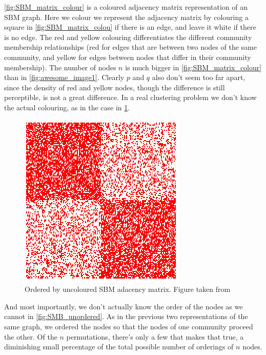 \ref{fig:SBM_matrix_colour} is a coloured adjacency matrix representation of an SBM graph. Here we colour we represent the adjacency matrix by colouring a square in \ref{fig:SBM_matrix_colou} if there is an edge, and leave it white if there is no edge.  The red and yellow colouring differentiates the different community membership relationships (red for edges that are between two nodes of the same community, and yellow for edges between nodes that differ in their community membership). The number of nodes $n$ is much bigger in \ref{fig:SBM_matrix_colour} than in \ref{fig:awesome_image1}. Clearly $p$ and $q$ also don't seem too far apart, since the density of red and yellow nodes, though the difference is still perceptible, is not a great difference.  In a real clustering problem we don't know the actual colouring, as in the case in \ref{fig:SMB_uncolored}.

\begin{figure}[h]
\begin{center}
  \includegraphics[scale=0.5]{SMB_uncolored}
  \caption{Ordered by uncoloured SBM adacency matrix.  Figure taken from \cite{SBM_adjacency_talk}}
  \label{fig:SMB_uncolored}
 \end{center}
\end{figure}

And most importantly, we don't actually know the order of the nodes as we cannot in \ref{fig:SMB_unordered}.  As in the previous two representations of the same graph, we ordered the nodes so that the nodes of one community proceed the other.  Of the $n\!$ permutations, there's only a few that makes that true, a diminishing small percentage of the total possible number of orderings of $n$ nodes.  


